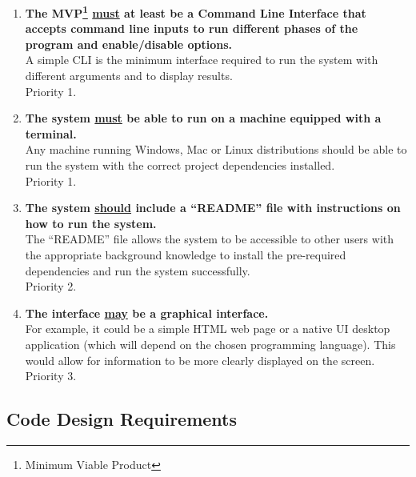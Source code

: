 \begin{enumerate}[label=F\arabic*,resume]

    \item \textbf{The MVP\footnote{Minimum Viable Product} \underline{must} at least be a Command Line Interface that accepts command line inputs to run different phases of the program and enable/disable options.}\\
    A simple CLI is the minimum interface required to run the system with different arguments and to display results.\\
    Priority 1.
    
    \item \textbf{The system \underline{must} be able to run on a machine equipped with a terminal.}\\
    Any machine running Windows, Mac or Linux distributions should be able to run the system with the correct project dependencies installed.\\
    Priority 1.
        
    \item \textbf{The system \underline{should} include a ``README'' file with instructions on how to run the system.}\\
    The ``README'' file allows the system to be accessible to other users with the appropriate background knowledge to install the pre-required dependencies and run the system successfully.\\
    Priority 2.
    
    \item \textbf{The interface \underline{may} be a graphical interface.}\\
    For example, it could be a simple HTML web page or a native UI desktop application (which will depend on the chosen programming language). This would allow for information to be more clearly displayed on the screen.\\
    Priority 3.
        
\end{enumerate}

\subsection{Code Design Requirements}

